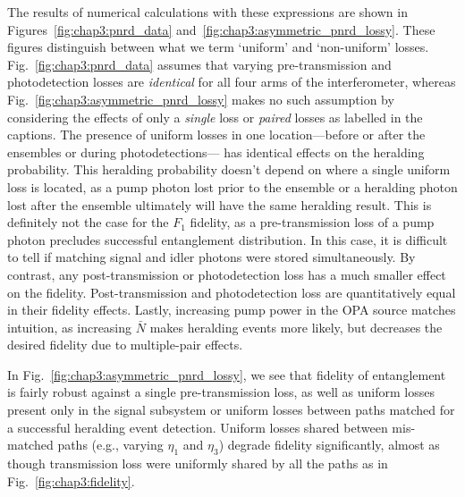 \documentclass[aps,twocolumn,secnumarabic,amsmath,amssymb,pra,groupedaddress,
showpacs, showkeys]{revtex4-1}
\begin{document}
The results of numerical calculations with these expressions are shown in
Figures~\ref{fig:chap3:pnrd_data}
and~\ref{fig:chap3:asymmetric_pnrd_lossy}. These figures distinguish between
what we term `uniform' and `non-uniform' losses. Fig.~\ref{fig:chap3:pnrd_data}
assumes that varying pre-transmission and photodetection losses are
\emph{identical} for all four arms of the interferometer, whereas
Fig.~\ref{fig:chap3:asymmetric_pnrd_lossy} makes no such assumption by
considering the effects of only a \emph{single} loss or \emph{paired} losses as
labelled in the captions. The presence of uniform losses in one
location---before or after the ensembles or during photodetections--- has
identical effects on the heralding probability. This heralding probability
doesn't depend on where a single uniform loss is located, as a pump photon lost
prior to the ensemble or a heralding photon lost after the ensemble ultimately
will have the same heralding result. This is definitely not the case for the
$F_1$ fidelity, as a pre-transmission loss of a pump photon precludes
successful entanglement distribution. In this case, it is difficult to tell if
matching signal and idler photons were stored simultaneously. By contrast, any
post-transmission or photodetection loss has a much smaller effect on the
fidelity. Post-transmission and photodetection loss are quantitatively equal in
their fidelity effects. Lastly, increasing pump power in the OPA source matches
intuition, as increasing $\bar{N}$ makes heralding events more likely, but
decreases the desired fidelity due to multiple-pair effects. 

In Fig.~\ref{fig:chap3:asymmetric_pnrd_lossy}, we see that fidelity of
entanglement is fairly robust against a single pre-transmission loss, as well
as uniform losses present only in the signal subsystem or uniform losses
between paths matched for a successful heralding event detection. Uniform
losses shared between mis-matched paths (e.g., varying $\eta_1$ and $\eta_3$)
degrade fidelity significantly, almost as though transmission loss were
uniformly shared by all the paths as in Fig.~\ref{fig:chap3:fidelity}. 
\end{document}
